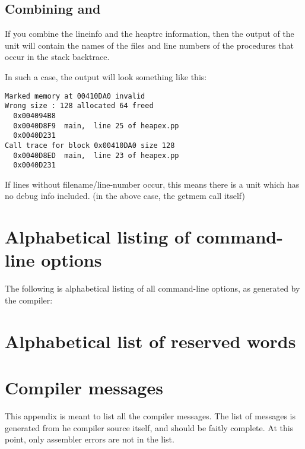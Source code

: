 \section{Combining  and }

If you combine the lineinfo and the heaptrc information, then the output
of the  unit will contain the names of the files and line
numbers of the procedures that occur in the stack backtrace.

In such a case, the output will look something like this:
\begin{verbatim}
Marked memory at 00410DA0 invalid
Wrong size : 128 allocated 64 freed
  0x004094B8
  0x0040D8F9  main,  line 25 of heapex.pp
  0x0040D231
Call trace for block 0x00410DA0 size 128
  0x0040D8ED  main,  line 23 of heapex.pp
  0x0040D231
\end{verbatim}
If lines without filename/line-number occur, this means there is a unit which
has no debug info included. (in the above case, the getmem call itself)



\chapter{Alphabetical listing of command-line options}
The following is alphabetical listing of all command-line options, as
generated by the compiler:



\chapter{Alphabetical list of reserved words}
\label{ch:reserved}
\begin{multicols}{3}

\end{multicols}


\chapter{Compiler messages}
\label{ch:ErrorMessages}
This appendix is meant to list all the compiler messages. The list of
messages is generated from he compiler source itself, and should be faitly
complete. At this point, only assembler errors are not in the list.

